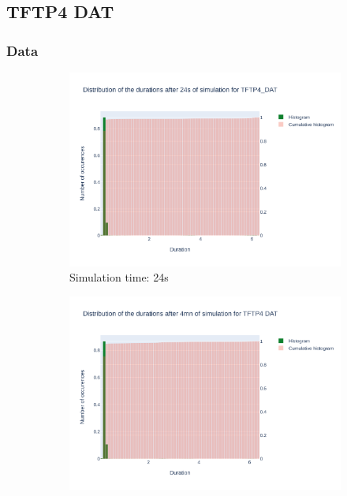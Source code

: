 \documentclass{article}
\begin{document}
\subsection{TFTP4 DAT}
\subsubsection{Data}

\begin{figure}[H]
    \centering
    \begin{subfigure}{.495\textwidth}
        \centering
        \includegraphics[width=\textwidth]{../fig/data/TFTP4_DAT_24s.png}
        \caption{Simulation time: 24s}
        \vspace{.5cm}
    \end{subfigure}
    \begin{subfigure}{.495\textwidth}
        \centering
        \includegraphics[width=\textwidth]{../fig/data/TFTP4 DAT_4mn.png}

\end{subfigure}
\end{figure}
\end{document}
